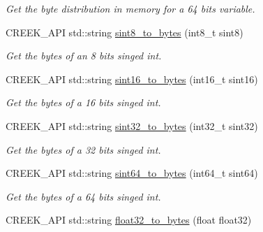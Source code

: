 \begin{DoxyCompactItemize}
\begin{DoxyCompactList}\small\item\em Get the byte distribution in memory for a 64 bits variable. \end{DoxyCompactList}\item 
C\+R\+E\+E\+K\+\_\+\+A\+PI std\+::string \hyperlink{namespacecreek_1_1_endian_a481648fdf8d11b7423565517f98e8ef7}{sint8\+\_\+to\+\_\+bytes} (int8\+\_\+t sint8)\hypertarget{namespacecreek_1_1_endian_a481648fdf8d11b7423565517f98e8ef7}{}\label{namespacecreek_1_1_endian_a481648fdf8d11b7423565517f98e8ef7}

\begin{DoxyCompactList}\small\item\em Get the bytes of an 8 bits singed int. \end{DoxyCompactList}\item 
C\+R\+E\+E\+K\+\_\+\+A\+PI std\+::string \hyperlink{namespacecreek_1_1_endian_a2ac876c4243b0a73f5cee1c742c39842}{sint16\+\_\+to\+\_\+bytes} (int16\+\_\+t sint16)\hypertarget{namespacecreek_1_1_endian_a2ac876c4243b0a73f5cee1c742c39842}{}\label{namespacecreek_1_1_endian_a2ac876c4243b0a73f5cee1c742c39842}

\begin{DoxyCompactList}\small\item\em Get the bytes of a 16 bits singed int. \end{DoxyCompactList}\item 
C\+R\+E\+E\+K\+\_\+\+A\+PI std\+::string \hyperlink{namespacecreek_1_1_endian_aaa477039b8074ea57524a2ff7cbb15ee}{sint32\+\_\+to\+\_\+bytes} (int32\+\_\+t sint32)\hypertarget{namespacecreek_1_1_endian_aaa477039b8074ea57524a2ff7cbb15ee}{}\label{namespacecreek_1_1_endian_aaa477039b8074ea57524a2ff7cbb15ee}

\begin{DoxyCompactList}\small\item\em Get the bytes of a 32 bits singed int. \end{DoxyCompactList}\item 
C\+R\+E\+E\+K\+\_\+\+A\+PI std\+::string \hyperlink{namespacecreek_1_1_endian_a7948bded940954fb5dab864326e11c42}{sint64\+\_\+to\+\_\+bytes} (int64\+\_\+t sint64)\hypertarget{namespacecreek_1_1_endian_a7948bded940954fb5dab864326e11c42}{}\label{namespacecreek_1_1_endian_a7948bded940954fb5dab864326e11c42}

\begin{DoxyCompactList}\small\item\em Get the bytes of a 64 bits singed int. \end{DoxyCompactList}\item 
C\+R\+E\+E\+K\+\_\+\+A\+PI std\+::string \hyperlink{namespacecreek_1_1_endian_a9035572235a911148c00edbcf4373094}{float32\+\_\+to\+\_\+bytes} (float float32)\hypertarget{namespacecreek_1_1_endian_a9035572235a911148c00edbcf4373094}{}\label{namespacecreek_1_1_endian_a9035572235a911148c00edbcf4373094}


\end{DoxyCompactItemize}
